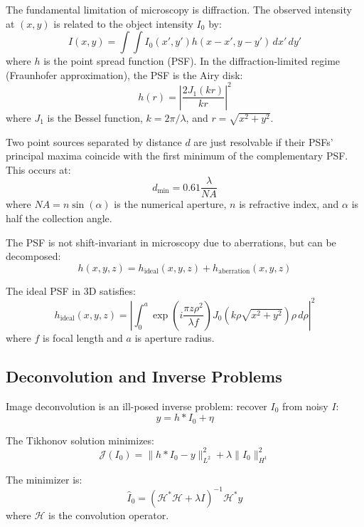 \documentclass[twocolumn,11pt]{article}
\begin{document}
The fundamental limitation of microscopy is diffraction. The observed intensity at $(x,y)$ is related to the object intensity $I_0$ by:
\begin{equation}
I(x,y) = \int \int I_0(x', y') h(x-x', y-y') \, dx' \, dy'
\end{equation}
where $h$ is the point spread function (PSF). In the diffraction-limited regime (Fraunhofer approximation), the PSF is the Airy disk:
\begin{equation}
h(r) = \left| \frac{2J_1(kr)}{kr} \right|^2
\end{equation}
where $J_1$ is the Bessel function, $k = 2\pi/\lambda$, and $r = \sqrt{x^2 + y^2}$.

\begin{theorem}
Two point sources separated by distance $d$ are just resolvable if their PSFs' principal maxima coincide with the first minimum of the complementary PSF. This occurs at:
\begin{equation}
d_{\min} = 0.61 \frac{\lambda}{NA}
\end{equation}
where $NA = n \sin(\alpha)$ is the numerical aperture, $n$ is refractive index, and $\alpha$ is half the collection angle.
\end{theorem}

The PSF is not shift-invariant in microscopy due to aberrations, but can be decomposed:
\begin{equation}
h(x,y,z) = h_{\text{ideal}}(x,y,z) + h_{\text{aberration}}(x,y,z)
\end{equation}

The ideal PSF in 3D satisfies:
\begin{equation}
h_{\text{ideal}}(x,y,z) = \left| \int_0^{a} \exp\left(i \frac{\pi z \rho^2}{\lambda f}\right) J_0(k\rho \sqrt{x^2+y^2}) \rho \, d\rho \right|^2
\end{equation}
where $f$ is focal length and $a$ is aperture radius.

\subsection{Deconvolution and Inverse Problems}

Image deconvolution is an ill-posed inverse problem: recover $I_0$ from noisy $I$:
\begin{equation}
y = h * I_0 + \eta
\end{equation}

\begin{definition}
The Tikhonov solution minimizes:
\begin{equation}
\mathcal{J}(I_0) = \|h * I_0 - y\|_{L^2}^2 + \lambda \|I_0\|_{H^1}^2
\end{equation}

The minimizer is:
\begin{equation}
\hat{I}_0 = (\mathcal{H}^* \mathcal{H} + \lambda I)^{-1} \mathcal{H}^* y
\end{equation}
where $\mathcal{H}$ is the convolution operator.
\end{definition}
\end{document}
